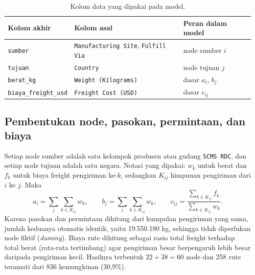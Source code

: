 \documentclass[a4paper,11pt]{article}
\begin{document}
\begin{table}[tbp]
\centering\footnotesize
\caption{Kolom data yang dipakai pada model.}\label{tab:cols}
\begin{tabular}{lll}
\toprule
Kolom akhir & Kolom asal & Peran dalam model \\ \midrule
\texttt{sumber} & \texttt{Manufacturing Site}, \texttt{Fulfill Via} & node sumber $i$ \\
\texttt{tujuan} & \texttt{Country} & node tujuan $j$ \\
\texttt{berat\_kg} & \texttt{Weight (Kilograms)} & dasar $a_i$, $b_j$ \\
\texttt{biaya\_freight\_usd} & \texttt{Freight Cost (USD)} & dasar $c_{ij}$ \\
\bottomrule
\end{tabular}
\end{table}

\subsection{Pembentukan node, pasokan, permintaan, dan biaya}
Setiap node sumber adalah satu kelompok produsen atau gudang \texttt{SCMS RDC}, dan setiap node tujuan adalah satu negara. Notasi yang dipakai: $w_k$ untuk berat dan $f_k$ untuk biaya freight pengiriman ke-$k$, sedangkan $K_{ij}$ himpunan pengiriman dari $i$ ke $j$. Maka
\begin{equation}
a_i=\sum_{j}\sum_{k\in K_{ij}} w_k,\qquad
b_j=\sum_{i}\sum_{k\in K_{ij}} w_k,\qquad
c_{ij}=\frac{\sum_{k\in K_{ij}} f_k}{\sum_{k\in K_{ij}} w_k}.
\label{eq:param}
\end{equation}
Karena pasokan dan permintaan dihitung dari kumpulan pengiriman yang sama, jumlah keduanya otomatis identik, yaitu 19.550.180 kg, sehingga tidak diperlukan node fiktif (\textit{dummy}). Biaya rute dihitung sebagai rasio total freight terhadap total berat (rata-rata tertimbang) agar pengiriman besar berpengaruh lebih besar daripada pengiriman kecil. Hasilnya terbentuk $22+38=60$ node dan 258 rute teramati dari $836$ kemungkinan (30,9\%).
\end{document}
